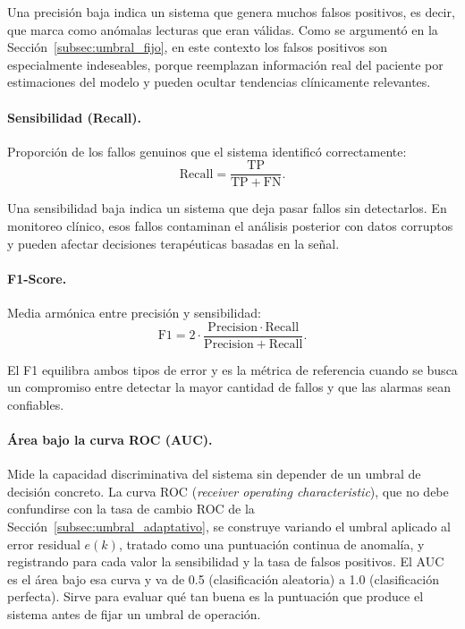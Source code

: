 \documentclass{report}
\begin{document}
Una precisión baja indica un sistema que genera muchos falsos positivos, es decir, que marca como anómalas lecturas que eran válidas. Como se argumentó en la Sección~\ref{subsec:umbral_fijo}, en este contexto los falsos positivos son especialmente indeseables, porque reemplazan información real del paciente por estimaciones del modelo y pueden ocultar tendencias clínicamente relevantes.

\paragraph{Sensibilidad (Recall).} Proporción de los fallos genuinos que el sistema identificó correctamente:
\begin{equation}
\label{eq:recall}
\mathrm{Recall} = \frac{\mathrm{TP}}{\mathrm{TP} + \mathrm{FN}}.
\end{equation}

Una sensibilidad baja indica un sistema que deja pasar fallos sin detectarlos. En monitoreo clínico, esos fallos contaminan el análisis posterior con datos corruptos y pueden afectar decisiones terapéuticas basadas en la señal.

\paragraph{F1-Score.} Media armónica entre precisión y sensibilidad:
\begin{equation}
\label{eq:f1}
\mathrm{F1} = 2 \cdot \frac{\mathrm{Precision} \cdot \mathrm{Recall}}{\mathrm{Precision} + \mathrm{Recall}}.
\end{equation}

El F1 equilibra ambos tipos de error y es la métrica de referencia cuando se busca un compromiso entre detectar la mayor cantidad de fallos y que las alarmas sean confiables.

\paragraph{Área bajo la curva ROC (AUC).} Mide la capacidad discriminativa del sistema sin depender de un umbral de decisión concreto. La curva ROC (\textit{receiver operating characteristic}), que no debe confundirse con la tasa de cambio ROC de la Sección~\ref{subsec:umbral_adaptativo}, se construye variando el umbral aplicado al error residual $e(k)$, tratado como una puntuación continua de anomalía, y registrando para cada valor la sensibilidad y la tasa de falsos positivos. El AUC es el área bajo esa curva y va de 0.5 (clasificación aleatoria) a 1.0 (clasificación perfecta). Sirve para evaluar qué tan buena es la puntuación que produce el sistema antes de fijar un umbral de operación.
\end{document}
